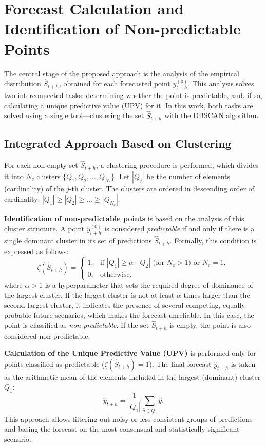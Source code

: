 \documentclass[a4paper,12pt]{extarticle}
\begin{document}
\section{Forecast Calculation and Identification of Non-predictable Points}

The central stage of the proposed approach is the analysis of the empirical distribution
 $\hat{S}_{t+h}$, obtained for each forecasted point $y_{t+h}^{(0)}$. This
  analysis solves two interconnected tasks: determining whether the point is predictable,
   and, if so, calculating a unique predictive value (UPV) for it. In this work, both
   tasks are solved using a single tool---clustering the set $\hat{S}_{t+h}$ with the DBSCAN algorithm. \cite{Aggarwal2013}

\subsection{Integrated Approach Based on Clustering}

For each non-empty set $\hat{S}_{t+h}$, a clustering procedure is performed,
 which divides it into $N_c$ clusters $\{Q_1, Q_2, \dots, Q_{N_c}\}$. Let $|Q_j|$ be the number of
  elements (cardinality) of the $j$-th cluster. The clusters are ordered in descending order of cardinality:
   $|Q_1| \ge |Q_2| \ge \dots \ge |Q_{N_c}|$.

\textbf{Identification of non-predictable points} is based on the analysis of this
cluster structure. A point $y_{t+h}^{(0)}$ is considered \textit{predictable} if
 and only if there is a single dominant cluster in its set of predictions $\hat{S}_{t+h}$.
 Formally, this condition is expressed as follows:
\[
\zeta(\hat{S}_{t+h}) =
\begin{cases}
1, & \text{if } |Q_1| \ge \alpha \cdot |Q_2| \text{ (for } N_c > 1\text{) or } N_c = 1, \\
0, & \text{otherwise,}
\end{cases}
\]
where $\alpha > 1$ is a hyperparameter that sets the required degree of dominance of the
largest cluster. If the largest cluster is not at least $\alpha$ times larger than the
 second-largest cluster, it indicates the
 presence of several competing, equally probable future scenarios, which makes
  the forecast unreliable. In this case, the point is classified as \textit{non-predictable}.
   If the set $\hat{S}_{t+h}$ is empty, the point is also considered non-predictable.

\textbf{Calculation of the Unique Predictive Value (UPV)} is performed only for
 points classified as predictable ($\zeta(\hat{S}_{t+h})=1$). The final forecast $\hat{y}_{t+h}$ is taken as the arithmetic mean of the elements included in the largest (dominant) cluster $Q_1$:
\[
\hat{y}_{t+h} = \frac{1}{|Q_1|} \sum_{\hat{y} \in Q_1} \hat{y}.
\]
This approach allows filtering out noisy or less consistent groups of
predictions and basing the forecast on the most consensual and statistically significant scenario.
\end{document}
